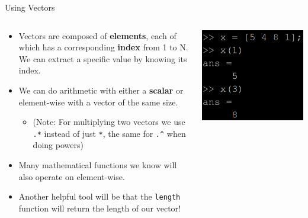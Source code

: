 {}\documentclass[letterpaper,
compress,
xcolor=x11names,
]{beamer}
\begin{document}
\begin{frame}{Using Vectors}
	\footnotesize
	\begin{columns}
		\begin{column}{0.75\linewidth}
			\begin{itemize}
				\item Vectors are composed of \textbf{elements}, each of which has a corresponding \textbf{index} from 1 to N. We can extract a specific value by knowing its index.
				\item We can do arithmetic with either a \textbf{scalar} or element-wise with a vector of the same size.
				\begin{itemize}
					\scriptsize
					\item (Note: For multiplying two vectors we use \texttt{.*} instead of just \texttt{*}, the same for \texttt{.\^{}} when doing powers)
				\end{itemize}
				\item Many mathematical functions we know will also operate on element-wise.
				\item Another helpful tool will be that the \texttt{length} function will return the length of our vector!
			\end{itemize}
		\end{column}
		\begin{column}{0.25\linewidth}
			\includegraphics[width = \linewidth]{vector_elements.png}

\end{column}
\end{columns}
\end{frame}
\end{document}
